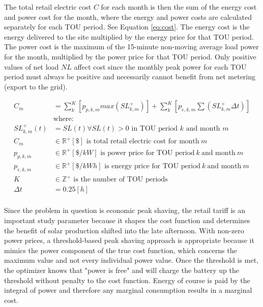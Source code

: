 \documentclass[journal,article,submit,pdftex,moreauthors]{Definitions/mdpi}
\begin{document}
The total retail electric cost \(C\) for each month is then the sum of the energy cost and power cost for the month, where the energy and power costs are calculated separately for each TOU period. See Equation \ref{eq:cost}. The energy cost is the energy delivered to the site multiplied by the energy price for that TOU period. The power cost is the maximum of the 15-minute non-moving average load power for the month, multiplied by the power price for that TOU period. Only positive values of net load \(NL\) affect cost since the monthly peak power for each TOU period must always be positive and necessarily cannot benefit from net metering (export to the grid).

\begin{equation}
  \label{eq:cost}
  \begin{split}
    C_m           & = \sum_k^K [p_{p,k,m}  max(SL^+_{k,m})] + \sum_k^K [p_{e,k,m} \sum (SL^+_{k,m}\Delta t) ] \\
                  & \text{where:}                                                                             \\
    SL_{k,m}^+(t) & = SL(t) \forall SL(t)>0 \text{ in TOU period $k$ and month $m$}                           \\
    C_m           & \in \mathbb{R}^+ [\$] \text{ is total retail electric cost for month}\ m\                 \\
    p_{p,k,m}     & \in \mathbb{R}^+ [\$/kW] \text{ is power price for TOU period}\ k\ \text{and month}\ m\   \\
    p_{e,k,m}     & \in \mathbb{R}^+ [\$/kWh] \text{ is energy price for TOU period}\ k\ \text{and month}\ m\ \\
    K             & \in \mathbb{Z}^+ \text{ is the number of TOU periods} \\
    \Delta t      & = 0.25 [h] \\
  \end{split}
\end{equation}

Since the problem in question is economic peak shaving, the retail tariff is an important study parameter because it shapes the cost function and determines the benefit of solar production shifted into the late afternoon. With non-zero power prices, a threshold-based peak shaving approach is appropriate because it mimics the power component of the true cost function, which concerns the maximum value and not every individual power value. Once the threshold is met, the optimizer knows that "power is free" and will charge the battery up the threshold without penalty to the cost function. Energy of course is paid by the integral of power and therefore any marginal consumption results in a marginal cost.
\end{document}
